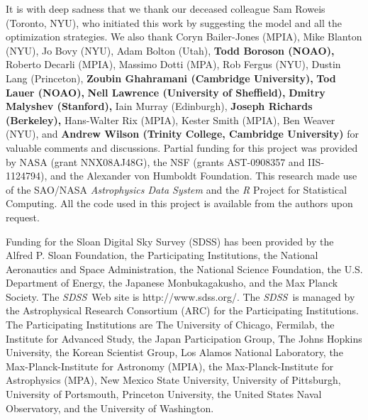 \documentclass[12pt,preprint]{aastex}
\newcommand{\project}[1]{\textsl{#1}}
\newcommand{\sdss}{\project{SDSS}}
\newcommand{\SDSS}{\sdss}
\begin{document}
\acknowledgments It is with deep sadness that we thank our deceased
colleague Sam Roweis (Toronto, NYU), who initiated this work by
suggesting the model and all the optimization strategies.  We also
thank 
 Coryn Bailer-Jones (MPIA),
 Mike Blanton (NYU),
 Jo Bovy (NYU),
 Adam Bolton (Utah),
 \textbf{Todd Boroson (NOAO),}
 Roberto Decarli (MPIA),
 Massimo Dotti (MPA),
 Rob Fergus (NYU),
 Dustin Lang (Princeton),
 \textbf{Zoubin Ghahramani (Cambridge University),}
 \textbf{Tod Lauer (NOAO),}
 \textbf{Nell Lawrence (University of Sheffield),}
 \textbf{Dmitry Malyshev (Stanford),}
 Iain Murray (Edinburgh),
 \textbf{Joseph Richards (Berkeley),}
 Hans-Walter Rix (MPIA),
 Kester Smith (MPIA),
 Ben Weaver (NYU), and
 \textbf{Andrew Wilson (Trinity College, Cambridge University)} for valuable
comments and discussions. Partial funding for this project was
provided by NASA (grant NNX08AJ48G), the NSF (grants AST-0908357 and IIS-1124794), and
the Alexander von Humboldt Foundation.  This research made use of the
SAO/NASA \project{Astrophysics Data System} and the \project{R}
Project for Statistical Computing.  All the code used in this project
is available from the authors upon request.

Funding for the Sloan Digital Sky Survey (SDSS) has been provided by
the Alfred P. Sloan Foundation, the Participating Institutions, the
National Aeronautics and Space Administration, the National Science
Foundation, the U.S. Department of Energy, the Japanese
Monbukagakusho, and the Max Planck Society. The \SDSS\ Web site is
http://www.sdss.org/. The \SDSS\ is managed by the Astrophysical
Research Consortium (ARC) for the Participating Institutions. The
Participating Institutions are The University of Chicago, Fermilab,
the Institute for Advanced Study, the Japan Participation Group, The
Johns Hopkins University, the Korean Scientist Group, Los Alamos
National Laboratory, the Max-Planck-Institute for Astronomy (MPIA),
the Max-Planck-Institute for Astrophysics (MPA), New Mexico State
University, University of Pittsburgh, University of Portsmouth,
Princeton University, the United States Naval Observatory, and the
University of Washington.
\end{document}
